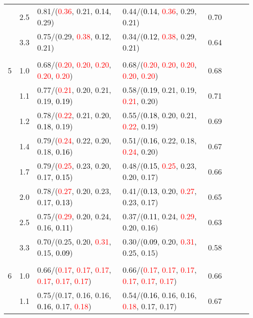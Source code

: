 \documentclass[10pt,a4paper]{report}
\begin{document}
\begin{table}[!htbp]
\begin{center}
{\begin{tabular}{ccllcccc}
			&2.5&0.81/(\textcolor{red}{0.36}, 0.21, \textcolor{black}{0.14}, 0.29)&0.44/(\textcolor{black}{0.14}, \textcolor{red}{0.36}, 0.29, 0.21)&0.70\\
			&3.3&0.75/(0.29, \textcolor{red}{0.38}, \textcolor{black}{0.12}, 0.21)&0.34/(\textcolor{black}{0.12}, \textcolor{red}{0.38}, 0.29, 0.21)&0.64\\
			&&&&\\
			5			&1.0&0.68/(\textcolor{red}{0.20}, \textcolor{red}{0.20}, \textcolor{red}{0.20}, \textcolor{red}{0.20}, \textcolor{red}{0.20})&0.68/(\textcolor{red}{0.20}, \textcolor{red}{0.20}, \textcolor{red}{0.20}, \textcolor{red}{0.20}, \textcolor{red}{0.20})&0.68\\
			&1.1&0.77/(\textcolor{red}{0.21}, 0.20, 0.21, 0.19, \textcolor{black}{0.19})&0.58/(\textcolor{black}{0.19}, 0.21, 0.19, \textcolor{red}{0.21}, 0.20)&0.71\\
			&1.2&0.78/(\textcolor{red}{0.22}, 0.21, 0.20, \textcolor{black}{0.18}, 0.19)&0.55/(\textcolor{black}{0.18}, 0.20, 0.21, \textcolor{red}{0.22}, 0.19)&0.69\\
			&1.4&0.79/(\textcolor{red}{0.24}, 0.22, 0.20, 0.18, \textcolor{black}{0.16})&0.51/(\textcolor{black}{0.16}, 0.22, 0.18, \textcolor{red}{0.24}, 0.20)&0.67\\
			&1.7&0.79/(\textcolor{red}{0.25}, 0.23, 0.20, 0.17, \textcolor{black}{0.15})&0.48/(\textcolor{black}{0.15}, \textcolor{red}{0.25}, 0.23, 0.20, 0.17)&0.66\\
			&2.0&0.78/(\textcolor{red}{0.27}, 0.20, 0.23, 0.17, \textcolor{black}{0.13})&0.41/(\textcolor{black}{0.13}, 0.20, \textcolor{red}{0.27}, 0.23, 0.17)&0.65\\
			&2.5&0.75/(\textcolor{red}{0.29}, 0.20, 0.24, 0.16, \textcolor{black}{0.11})&0.37/(\textcolor{black}{0.11}, 0.24, \textcolor{red}{0.29}, 0.20, 0.16)&0.63\\
			&3.3&0.70/(0.25, 0.20, \textcolor{red}{0.31}, 0.15, \textcolor{black}{0.09})&0.30/(\textcolor{black}{0.09}, 0.20, \textcolor{red}{0.31}, 0.25, 0.15)&0.58\\
			&&&&\\
			6			&1.0&0.66/(\textcolor{red}{0.17}, \textcolor{red}{0.17}, \textcolor{red}{0.17}, \textcolor{red}{0.17}, \textcolor{red}{0.17}, \textcolor{red}{0.17})&0.66/(\textcolor{red}{0.17}, \textcolor{red}{0.17}, \textcolor{red}{0.17}, \textcolor{red}{0.17}, \textcolor{red}{0.17}, \textcolor{red}{0.17})&0.66\\
			&1.1&0.75/(0.17, 0.16, 0.16, \textcolor{black}{0.16}, 0.17, \textcolor{red}{0.18})&0.54/(\textcolor{black}{0.16}, 0.16, 0.16, \textcolor{red}{0.18}, 0.17, 0.17)&0.67\\

\end{tabular}}
\end{center}
\end{table}
\end{document}
